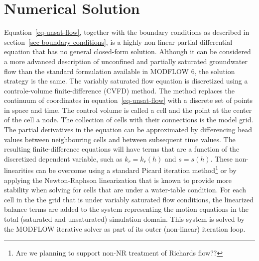 \documentclass[fleqn]{article}
\begin{document}
\section{Numerical Solution}
Equation~\ref{eq-unsat-flow}, together with the boundary conditions as
described in section~\ref{sec-boundary-conditions}, is a highly non-linear
partial differential equation that has no general closed-form solution.
Although it can be considered a more advanced description of unconfined
and partially saturated groundwater flow than the standard formulation
available in MODFLOW 6, the solution strategy is the same. The variably
saturated flow equation is discretized using a controle-volume
finite-difference (CVFD) method. The method replaces the continuum of
coordinates in equation~\ref{eq-unsat-flow} with a discrete set of 
points in space and time. The control volume is called a cell and the
point at the center of the cell a node. The collection of cells with
their connections is the model grid. The partial derivatives in the
equation can be approximated by differencing head values between 
neighbouring cells and between subsequent time values. The resulting
finite-difference equations will have terms that are a function
of the discretized dependent variable, such as $k_r = k_r(h)$ and 
$s = s(h)$. These non-linearities can be overcome using a standard
Picard iteration method\footnote{Are we planning to support non-NR
treatment of Richards flow??} or by applying the Newton-Raphson 
linearization that is known to provide more stability when solving for
cells that are under a water-table condition. For each cell in the
the grid that is under variably saturated flow conditions, the
linearized balance terms are added to the system representing the
motion equations in the total (saturated and unsaturated) simulation 
domain. This system is solved by the MODFLOW iterative solver as part
of its outer (non-linear) iteration loop.
\end{document}

